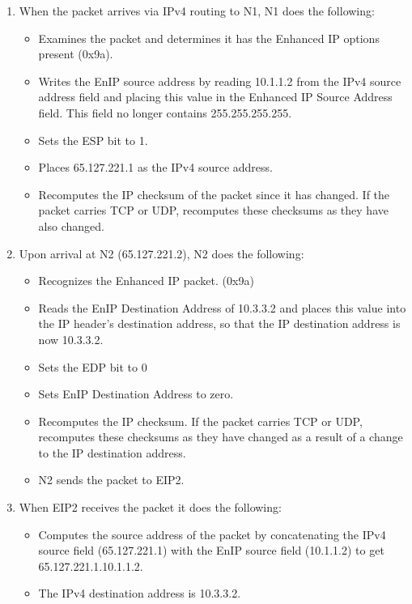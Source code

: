 \begin{enumerate}
\item When the packet arrives via IPv4 routing to N1, N1 does the following:
  \begin{itemize}
  \item Examines the packet and determines it has the Enhanced IP options present (0x9a). 
  \item Writes the EnIP source address by reading 10.1.1.2 from the IPv4 source address field and
  placing this value in the Enhanced IP Source Address field.  This field no longer contains 255.255.255.255.
  \item  Sets the ESP bit to 1.
  \item  Places 65.127.221.1 as the IPv4 source address.
  \item  Recomputes the IP checksum of the packet since it has changed.  If the packet carries TCP or UDP, recomputes these checksums as they have also changed.
  \end{itemize}
\item Upon arrival at N2 (65.127.221.2), N2 does the following:
  \begin{itemize}
  \item Recognizes the Enhanced IP packet. (0x9a)
  \item Reads the EnIP Destination Address of 10.3.3.2 and places this value into the IP header's destination address, so that the IP destination address is now 10.3.3.2.
  \item Sets the EDP bit to 0
  \item Sets EnIP Destination Address to zero.
  \item Recomputes the IP checksum.  If the packet carries TCP or UDP, recomputes these checksums as they have changed as a result of a change to the IP destination address.
  \item N2 sends the packet to EIP2.
  \end{itemize}

  \item When EIP2 receives the packet it does the following:
  \begin{itemize}
   \item Computes the source address of the packet by concatenating the 
  IPv4 source field (65.127.221.1) with the EnIP source field (10.1.1.2) to get 65.127.221.1.10.1.1.2.
  \item The IPv4 destination address is 10.3.3.2.
  \end{itemize}


\end{enumerate}
